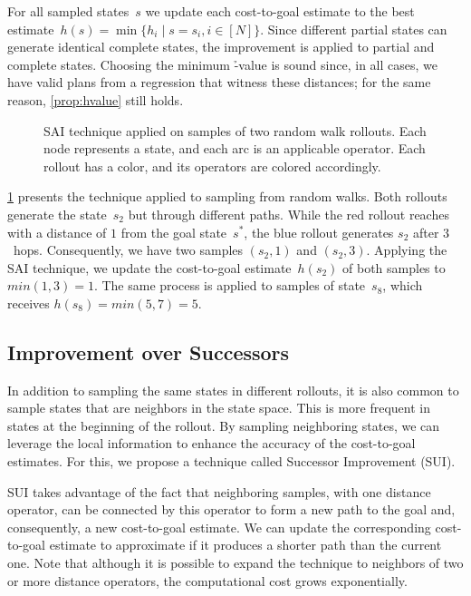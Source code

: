 For all sampled states~$s$ we update each cost-to-goal estimate to the best estimate~$h(s) = \min\{h_i \mid s=s_i, i\in[N]\}$. Since different partial states can generate identical complete states, the improvement is applied to partial and complete states. Choosing the minimum \h-value is sound since, in all cases, we have valid plans from a regression that witness these distances; for the same reason, \cref{prop:hvalue} still holds.

\begin{figure}[tb]
    \caption[SAI technique applied on samples of random walk rollouts.]{SAI technique applied on samples of two random walk rollouts. Each node represents a state, and each arc is an applicable operator. Each rollout has a color, and its operators are colored accordingly.}
    \label{fig:sai}
    \addmargin
    \centering
    
\end{figure}

\cref{fig:sai} presents the technique applied to sampling from random walks. Both rollouts generate the state~$s_2$ but through different paths. While the red rollout reaches with a distance of $1$ from the goal state~$s^*$, the blue rollout generates $s_2$ after $3$~hops. Consequently, we have two samples $(s_2,1)$ and $(s_2,3)$. Applying the SAI technique, we update the cost-to-goal estimate~$h(s_2)$ of both samples to $min(1,3)=1$. The same process is applied to samples of state~$s_8$, which receives $h(s_8)=min(5,7)=5$.

\subsection{Improvement over Successors}
\label{sec:sui}

In addition to sampling the same states in different rollouts, it is also common to sample states that are neighbors in the state space. This is more frequent in states at the beginning of the rollout. By sampling neighboring states, we can leverage the local information to enhance the accuracy of the cost-to-goal estimates. For this, we propose a technique called Successor Improvement (SUI).

SUI takes advantage of the fact that neighboring samples, with one distance operator, can be connected by this operator to form a new path to the goal and, consequently, a new cost-to-goal estimate. We can update the corresponding cost-to-goal estimate to approximate \hstar if it produces a shorter path than the current one. Note that although it is possible to expand the technique to neighbors of two or more distance operators, the computational cost grows exponentially.


